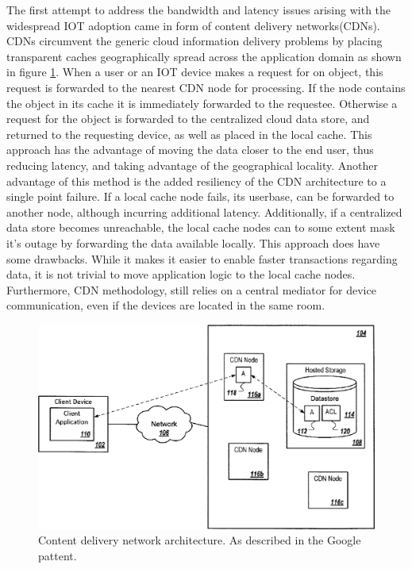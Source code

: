 The first attempt to address the bandwidth and latency issues arising with the widespread IOT adoption came in form of content delivery networks(CDNs).\cite{gagliardi2011content} CDNs circumvent the generic cloud information delivery problems by placing transparent caches geographically spread across the application domain as shown in figure \ref{lit:fig:2}. When a user or an IOT device makes a request for on object, this request is forwarded to the nearest CDN node for processing. If the node contains the object in its cache it is immediately forwarded to the requestee. Otherwise a request for the object is forwarded to the centralized cloud data store, and returned to the requesting device, as well as placed in the local cache. This approach has the advantage of moving the data closer to the end user, thus reducing latency, and taking advantage of the geographical locality. Another advantage of this method is the added resiliency of the CDN architecture to a single point failure. If a local cache node fails, its userbase, can be forwarded to another node, although incurring additional latency. Additionally, if a centralized data store becomes unreachable, the local cache nodes can to some extent mask it's outage by forwarding the data available locally. This approach does have some drawbacks. While it makes it easier to enable faster transactions regarding data, it is not trivial to move application logic to the local cache nodes. Furthermore, CDN methodology, still relies on a central mediator for device communication, even if the devices are located in the same room. 

\begin{figure}[h]
	\centering
	\includegraphics[width=0.6\linewidth]{img/cdn.png}	
	\caption{Content delivery network architecture. As described in the Google pattent.\cite{gagliardi2011content}}
	\label{lit:fig:2}
\end{figure}

